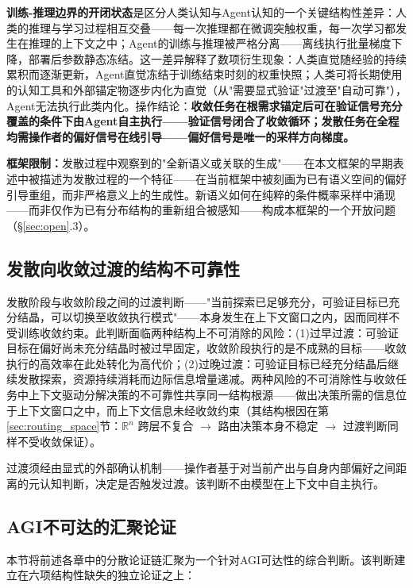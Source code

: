 \documentclass[11pt,a4paper]{article}
\theoremstyle{definition}
\begin{document}
\textbf{训练-推理边界的开闭状态}是区分人类认知与Agent认知的一个关键结构性差异：人类的推理与学习过程相互交叠——每一次推理都在微调突触权重，每一次学习都发生在推理的上下文之中；Agent的训练与推理被严格分离——离线执行批量梯度下降，部署后参数静态冻结。这一差异解释了数项衍生现象：人类直觉随经验的持续累积而逐渐更新，Agent直觉冻结于训练结束时刻的权重快照；人类可将长期使用的认知工具和外部锚定物逐步内化为直觉（从"需要显式验证"过渡至"自动可靠"），Agent无法执行此类内化。操作结论：\textbf{收敛任务在根需求锚定后可在验证信号充分覆盖的条件下由Agent自主执行——验证信号闭合了收敛循环；发散任务在全程均需操作者的偏好信号在线引导——偏好信号是唯一的采样方向梯度。}

\textbf{框架限制：}发散过程中观察到的"全新语义或关联的生成"——在本文框架的早期表述中被描述为发散过程的一个特征——在当前框架中被刻画为已有语义空间的偏好引导重组，而非严格意义上的生成性。新语义如何在纯粹的条件概率采样中涌现——而非仅作为已有分布结构的重新组合被感知——构成本框架的一个开放问题（\S\ref{sec:open}.3）。

\subsection{发散向收敛过渡的结构不可靠性}

发散阶段与收敛阶段之间的过渡判断——"当前探索已足够充分，可验证目标已充分结晶，可以切换至收敛执行模式"——本身发生在上下文窗口之内，因而同样不受训练收敛约束。此判断面临两种结构上不可消除的风险：(1)过早过渡：可验证目标在偏好尚未充分结晶时被过早固定，收敛阶段执行的是不成熟的目标——收敛执行的高效率在此处转化为高代价；(2)过晚过渡：可验证目标已经充分结晶后继续发散探索，资源持续消耗而边际信息增量递减。两种风险的不可消除性与收敛任务中上下文驱动分解决策的不可靠性共享同一结构根源——做出决策所需的信息位于上下文窗口之中，而上下文信息未经收敛约束（其结构根因在第\ref{sec:routing_space}节：$\mathbb{R}^n$ 跨层不复合 $\to$ 路由决策本身不稳定 $\to$ 过渡判断同样不受收敛保证）。

过渡须经由显式的外部确认机制——操作者基于对当前产出与自身内部偏好之间距离的元认知判断，决定是否触发过渡。该判断不由模型在上下文中自主执行。

\subsection{AGI不可达的汇聚论证}
\label{sec:agi}

本节将前述各章中的分散论证链汇聚为一个针对AGI可达性的综合判断。该判断建立在六项结构性缺失的独立论证之上：
\end{document}
